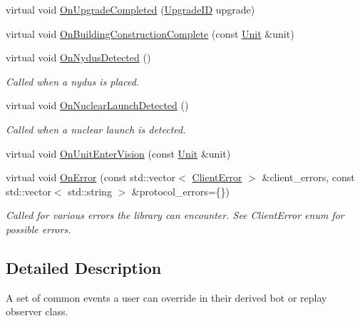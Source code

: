 \begin{DoxyCompactItemize}
\item 
virtual void \hyperlink{classsc2_1_1_client_events_a0ff0017571ba53e018f85dda03861c3a}{On\+Upgrade\+Completed} (\hyperlink{classsc2_1_1_s_c2_type}{Upgrade\+ID} upgrade)
\item 
virtual void \hyperlink{classsc2_1_1_client_events_a9bf081c662bf5e5e64598f8c05f9a309}{On\+Building\+Construction\+Complete} (const \hyperlink{classsc2_1_1_unit}{Unit} \&unit)
\item 
\mbox{\label{classsc2_1_1_client_events_afde152c65ab94bdb57e345a8fd1532aa}} 
virtual void \hyperlink{classsc2_1_1_client_events_afde152c65ab94bdb57e345a8fd1532aa}{On\+Nydus\+Detected} ()
\begin{DoxyCompactList}\small\item\em Called when a nydus is placed. \end{DoxyCompactList}\item 
\mbox{\label{classsc2_1_1_client_events_ab9923f256e3bf6e518ccb8ec26f8ae88}} 
virtual void \hyperlink{classsc2_1_1_client_events_ab9923f256e3bf6e518ccb8ec26f8ae88}{On\+Nuclear\+Launch\+Detected} ()
\begin{DoxyCompactList}\small\item\em Called when a nuclear launch is detected. \end{DoxyCompactList}\item 
virtual void \hyperlink{classsc2_1_1_client_events_aecbbd77ffd17a729b307f87bbb899cc9}{On\+Unit\+Enter\+Vision} (const \hyperlink{classsc2_1_1_unit}{Unit} \&unit)
\item 
\mbox{\label{classsc2_1_1_client_events_a5205616dd617571eca2b437d8baf257d}} 
virtual void \hyperlink{classsc2_1_1_client_events_a5205616dd617571eca2b437d8baf257d}{On\+Error} (const std\+::vector$<$ \hyperlink{sc2__client_8h_ac7d3e3694a208204e099f04c1e5eded0}{Client\+Error} $>$ \&client\+\_\+errors, const std\+::vector$<$ std\+::string $>$ \&protocol\+\_\+errors=\{\})
\begin{DoxyCompactList}\small\item\em Called for various errors the library can encounter. See Client\+Error enum for possible errors. \end{DoxyCompactList}\end{DoxyCompactItemize}


\subsection{Detailed Description}
A set of common events a user can override in their derived bot or replay observer class. 

